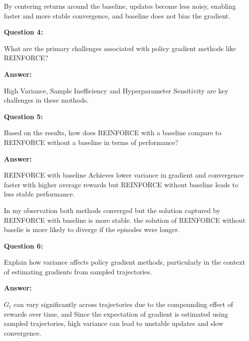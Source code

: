 \documentclass[12pt]{article}
\begin{document}
{{{{By centering returns around the baseline, updates become less noisy, enabling faster and more stable convergence, and baseline does not bias the gradient.

\textbf{Question 4:}

What are the primary challenges associated with policy gradient methods like REINFORCE?

\textbf{Answer:}

High Variance, Sample Inefficiency and Hyperparameter Sensitivity are key challenges in these mothods.

\textbf{Question 5:}

Based on the results, how does REINFORCE with a baseline compare to REINFORCE without a baseline
in terms of performance?

\textbf{Answer:}

REINFORCE with baseline Achieves lower variance in gradient and convergence faster with higher average rewards but REINFORCE without baseline leads to less stable performance.

In my observation both methods converged but the solution captured by REINFORCE with baseline is more stable. the solution of REINFORCE without baselie is more likely to diverge if the episodes were longer.


\textbf{Question 6:}

Explain how variance affects policy gradient methods, particularly in the context of estimating gradients
from sampled trajectories.

\textbf{Answer:}

$G_t$ can vary significantly across trajectories due to the compounding effect of rewards over time, and Since the expectation of gradient is estimated using sampled trajectories, high variance can lead to unstable updates and slow convergence.

}}




\newpage

{}}}
\end{document}
